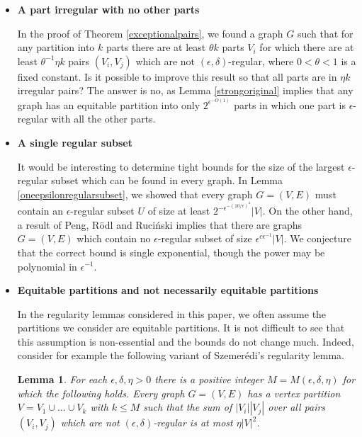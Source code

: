 \documentclass[11pt]{article}
\newtheorem{lemma}{Lemma}[section]
\begin{document}
\begin{itemize}
By iterative application of Lemma \ref{strongoriginal}, one can also obtain a
version of the Duke-Lefmann-R\"odl lemma such that all cylinders in the
partition are $\epsilon$-regular. In fact, using Lemma \ref{epsdeltaone}, one
can further guarantee that all cylinders in the partition are strongly
$\epsilon$-regular, and the bound is still of constant-tower height.

\item{\bf A part irregular with no other parts}

In the proof of Theorem \ref{exceptionalpairs}, we found a graph $G$ such that for any partition into $k$ parts there are at least $\theta k$ parts $V_i$ for which there are at
least $\theta^{-1}\eta k$ pairs $(V_i,V_j)$ which are not
$(\epsilon,\delta)$-regular, where $0<\theta<1$ is a fixed constant. Is it
possible to improve this result so that all parts are in $\eta k$ irregular
pairs? The answer is no, as Lemma \ref{strongoriginal} implies that any graph
has an equitable partition into only $2^{\epsilon^{-O(1)}}$ parts in which one
part is $\epsilon$-regular with all the other parts.

\item {\bf A single regular subset}

It would be interesting to determine tight bounds for the size of the largest $\epsilon$-regular subset which can be found in every graph. In Lemma \ref{oneepsilonregularsubset}, we showed that every graph $G = (V, E)$ must contain an $\epsilon$-regular subset $U$ of size at least $2^{-\epsilon^{-(10/\epsilon)^4}} |V|$. On the other hand, a result of Peng, R\"odl and Ruci\'nski \cite{PRR} implies that there are graphs $G = (V, E)$ which contain no $\epsilon$-regular subset of size $\epsilon^{c\epsilon^{-1}} |V|$. We conjecture that the correct bound is single exponential, though the power may be polynomial in $\epsilon^{-1}$. 

\item {\bf Equitable partitions and not necessarily equitable partitions}

In the regularity lemmas considered in this paper, we often assume the
partitions we consider are equitable partitions. It is not difficult to see
that this assumption is non-essential and the bounds do not change much.
Indeed, consider for example the following variant of Szemer\'edi's regularity
lemma.

\begin{lemma}\label{szemvar}
For each $\epsilon,\delta,\eta>0$ there is a positive integer
$M=M(\epsilon,\delta,\eta)$ for which the following holds. Every graph
$G=(V,E)$ has a vertex partition $V=V_1 \cup \ldots \cup V_k$ with $k \leq M$
such that the sum of $|V_i||V_j|$ over all pairs $(V_i,V_j)$ which are not
$(\epsilon,\delta)$-regular is at most $\eta |V|^2$.
\end{lemma}


\end{itemize}
\end{document}

